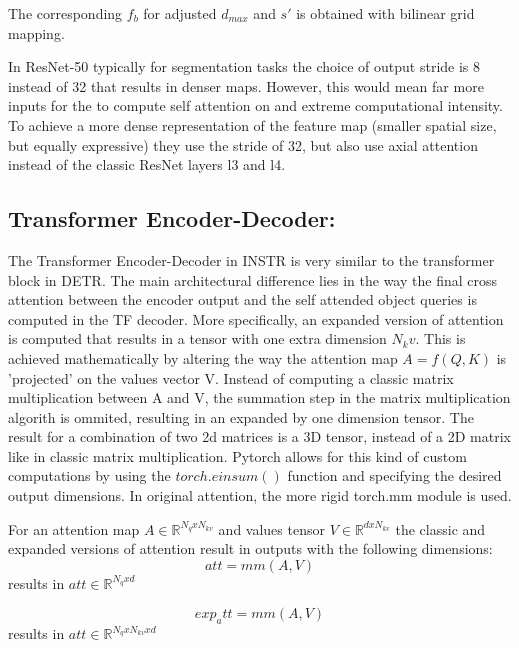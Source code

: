 The corresponding $f_b$ for adjusted $d_{max}$ and $s'$ is obtained with bilinear grid mapping.

In ResNet-50 typically for segmentation tasks the choice of output stride is 8 instead of 32 that results in denser maps. However, this would mean far more inputs for the  to compute self attention on and extreme computational intensity. To achieve a more dense representation of the feature map (smaller spatial size, but equally expressive) they use the stride of 32, but also use axial attention \cite{axial} instead of the classic ResNet layers l3 and l4.
\subsection{Transformer Encoder-Decoder:}

The Transformer Encoder-Decoder in INSTR is very similar to the transformer block in DETR. The main architectural difference lies in the way the final cross attention between the encoder output and the self attended object queries is computed in the TF decoder. More specifically, an expanded version of attention is computed that results in a tensor with one extra dimension $N_kv$. This is achieved mathematically by altering the way the attention map $A = f(Q, K)$ is 'projected' on the values vector V. Instead of computing a classic matrix multiplication between A and V, the summation step in the matrix multiplication algorith is ommited, resulting in an expanded by one dimension tensor. The result for a combination of two 2d matrices is a 3D tensor, instead of a 2D matrix like in classic matrix multiplication. Pytorch allows for this kind of custom computations by using the $torch.einsum()$ function and specifying the desired output dimensions. In original attention, the more rigid torch.mm module is used. \par

For an attention map $A \in \mathbb{R}^ {N_q x N_{kv}} $ and values tensor $V \in \mathbb{R}^ {d x N_{kv}} $ the classic and expanded versions of attention result in outputs with the following dimensions:
\begin{equation}
    att = mm(A, V)
\end{equation}
results in $att \in \mathbb{R}^ {N_q x d}$

\begin{equation}
    exp_att = mm(A, V)
\end{equation}
results in $att \in \mathbb{R}^ {N_q x N_{kv} x d}$

